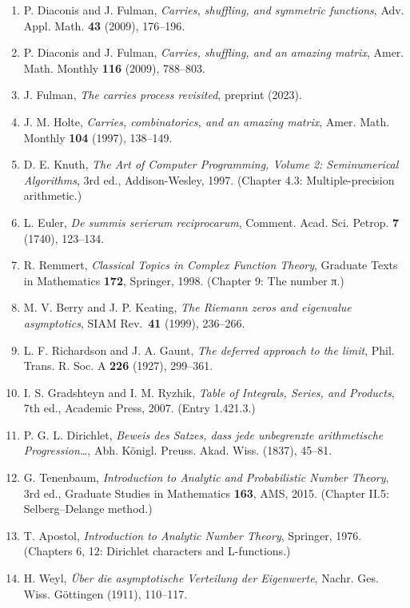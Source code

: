 \documentclass[
  11pt,
]{article}
\begin{document}
\begin{enumerate}
\def\labelenumi{\arabic{enumi}.}
\item
  P. Diaconis and J. Fulman, \emph{Carries, shuffling, and symmetric functions},
  Adv. Appl. Math. \textbf{43} (2009), 176--196.
\item
  P. Diaconis and J. Fulman, \emph{Carries, shuffling, and an amazing matrix},
  Amer. Math. Monthly \textbf{116} (2009), 788--803.
\item
  J. Fulman, \emph{The carries process revisited}, preprint (2023).
\item
  J. M. Holte, \emph{Carries, combinatorics, and an amazing matrix}, Amer. Math.
  Monthly \textbf{104} (1997), 138--149.
\item
  D. E. Knuth, \emph{The Art of Computer Programming, Volume 2: Seminumerical
  Algorithms}, 3rd ed., Addison-Wesley, 1997. (Chapter 4.3: Multiple-precision
  arithmetic.)
\item
  L. Euler, \emph{De summis serierum reciprocarum}, Comment. Acad. Sci. Petrop.
  \textbf{7} (1740), 123--134.
\item
  R. Remmert, \emph{Classical Topics in Complex Function Theory}, Graduate Texts
  in Mathematics \textbf{172}, Springer, 1998. (Chapter 9: The number π.)
\item
  M. V. Berry and J. P. Keating, \emph{The Riemann zeros and eigenvalue
  asymptotics}, SIAM Rev.~\textbf{41} (1999), 236--266.
\item
  L. F. Richardson and J. A. Gaunt, \emph{The deferred approach to the limit},
  Phil. Trans. R. Soc. A \textbf{226} (1927), 299--361.
\item
  I. S. Gradshteyn and I. M. Ryzhik, \emph{Table of Integrals, Series, and
  Products}, 7th ed., Academic Press, 2007. (Entry 1.421.3.)
\item
  P. G. L. Dirichlet, \emph{Beweis des Satzes, dass jede unbegrenzte
  arithmetische Progression\ldots{}}, Abh. Königl. Preuss. Akad. Wiss. (1837),
  45--81.
\item
  G. Tenenbaum, \emph{Introduction to Analytic and Probabilistic Number Theory},
  3rd ed., Graduate Studies in Mathematics \textbf{163}, AMS, 2015. (Chapter
  II.5: Selberg--Delange method.)
\item
  T. Apostol, \emph{Introduction to Analytic Number Theory}, Springer, 1976.
  (Chapters 6, 12: Dirichlet characters and L-functions.)
\item
  H. Weyl, \emph{Über die asymptotische Verteilung der Eigenwerte}, Nachr. Ges.
  Wiss. Göttingen (1911), 110--117.

\end{enumerate}
\end{document}
